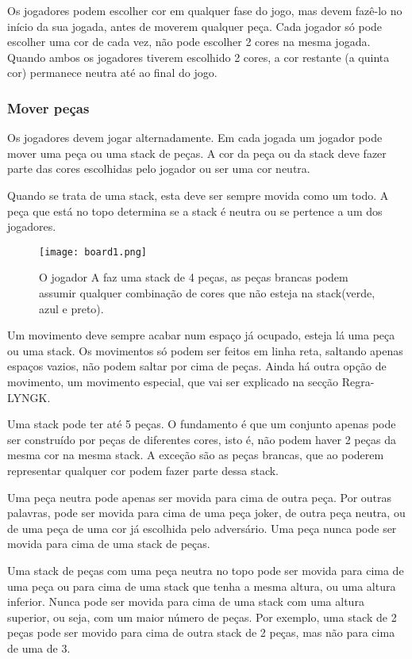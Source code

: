 \documentclass[a4paper]{article}
\begin{document}
Os jogadores podem escolher cor em qualquer fase do jogo, mas devem fazê-lo no início da sua jogada, antes de moverem qualquer peça. Cada jogador só pode escolher uma cor de cada vez, não pode escolher 2 cores na mesma jogada. Quando ambos os jogadores tiverem escolhido 2 cores, a cor restante (a quinta cor) permanece neutra até ao final do jogo.


\subsubsection{Mover peças}

Os jogadores devem jogar alternadamente. Em cada jogada um jogador pode mover uma peça ou uma stack de peças. A cor da peça ou da stack deve fazer parte das cores escolhidas pelo jogador ou ser uma cor neutra.

Quando se trata de uma stack, esta deve ser sempre movida como um todo.  A peça que está no topo determina se a stack é neutra ou se pertence a um dos jogadores.

\begin{wrapfigure}{R}{0.3\textwidth}
\texttt{[image: board1.png]}
\caption{\label{fig:Board1}O jogador A faz uma stack de 4 peças, as peças brancas podem assumir qualquer combinação de cores que não esteja na stack(verde, azul e preto).}
\end{wrapfigure}

Um movimento deve sempre acabar num espaço já ocupado, esteja lá uma peça ou uma stack. Os movimentos só podem ser feitos em linha reta, saltando apenas espaços vazios, não podem saltar por cima de peças. Ainda há outra opção de movimento, um movimento especial, que vai ser explicado na secção Regra-LYNGK.

Uma stack pode ter até 5 peças. O fundamento é que um conjunto apenas pode ser construído por peças de diferentes cores, isto é, não podem haver 2 peças da mesma cor na mesma stack. A exceção são as peças brancas, que ao poderem representar qualquer cor podem fazer parte dessa stack.

Uma peça neutra pode apenas ser movida para cima de outra peça. Por outras palavras, pode ser movida para cima de uma peça joker, de outra peça neutra, ou de uma peça de uma cor já escolhida pelo adversário. Uma peça nunca pode ser movida para cima de uma stack de peças.

Uma stack de peças com uma peça neutra no topo pode ser movida para cima de uma peça ou para cima de uma stack que tenha a mesma altura, ou uma altura inferior. Nunca pode ser movida para cima de uma stack com uma altura superior, ou seja, com  um maior número de peças. Por exemplo, uma stack de 2 peças pode ser movido para cima de outra stack de 2 peças, mas não para cima de uma de 3.
\end{document}
